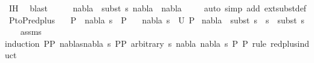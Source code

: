 \begin{isabellebody}
\ IH\ \isamarkupfalse%
\ blast\isanewline
\ \ \isamarkupfalse%
\ \isamarkupfalse%
\ {\isachardoublequoteopen}nabla{}\ {\isasymTurnstile}\ {\isacharparenleft}{\kern0pt}subst\ s{}{\isacharparenright}{\kern0pt}\ {\isacharparenleft}{\kern0pt}nabla{}\ {\isasymunion}\ nabla{}{\isacharparenright}{\kern0pt}{\isachardoublequoteclose}\isanewline
\ \ \ \ \isamarkupfalse%
{\isacharparenleft}{\kern0pt}auto\ simp\ add{\isacharcolon}{\kern0pt}\ ext{\isacharunderscore}{\kern0pt}subst{\isacharunderscore}{\kern0pt}def{\isacharparenright}{\kern0pt}\isanewline
{}\isamarkupfalse%
%
\endisatagproof
{\isafoldproof}%
%
\isadelimproof
\isanewline
%
\endisadelimproof
\isanewline
{}\isamarkupfalse%
\ P{}{\isacharunderscore}{\kern0pt}to{\isacharunderscore}{\kern0pt}P{}{\isacharunderscore}{\kern0pt}red{\isacharunderscore}{\kern0pt}plus{}{\isacharcolon}{\kern0pt}\isanewline
\ \ \ {\isachardoublequoteopen}P{}\ {\isasymTurnstile}\ {\isacharparenleft}{\kern0pt}nabla{\isacharcomma}{\kern0pt}\ s{\isacharparenright}{\kern0pt}\ {\isasymRightarrow}\ P{}{\isachardoublequoteclose}\isanewline
\ \ \ {\isachardoublequoteopen}{\isacharparenleft}{\kern0pt}nabla{}{\isacharcomma}{\kern0pt}\ s{}{\isacharparenright}{\kern0pt}\ {\isasymin}\ U\ P{}{\isachardoublequoteclose}\isanewline
{}\ {\isachardoublequoteopen}nabla{}\ {\isasymTurnstile}\ subst\ {\isacharparenleft}{\kern0pt}s{}\ {\isasymbullet}\ s{\isacharparenright}{\kern0pt}\ {\isasymapprox}\ subst\ s{}{\isachardoublequoteclose}\isanewline
%
\isadelimproof
\ \ %
\endisadelimproof
%
\isatagproof
{}\isamarkupfalse%
\ assms\isanewline
{}\isamarkupfalse%
{\isacharparenleft}{\kern0pt}induction\ P{}{\isasymequiv}{\isachardoublequoteopen}P{}{\isachardoublequoteclose}\ nablas{\isasymequiv}{\isachardoublequoteopen}{\isacharparenleft}{\kern0pt}nabla{\isacharcomma}{\kern0pt}\ s{\isacharparenright}{\kern0pt}{\isachardoublequoteclose}\ P{}{\isasymequiv}{\isachardoublequoteopen}P{}{\isachardoublequoteclose}\ arbitrary{\isacharcolon}{\kern0pt}\ s\ nabla{}\ nabla\ s{}\ P{}\ P{}\ rule{\isacharcolon}{\kern0pt}\ red{\isacharunderscore}{\kern0pt}plus{\isachardot}{\kern0pt}induct{\isacharparenright}{\kern0pt}\isanewline

\end{isabellebody}
